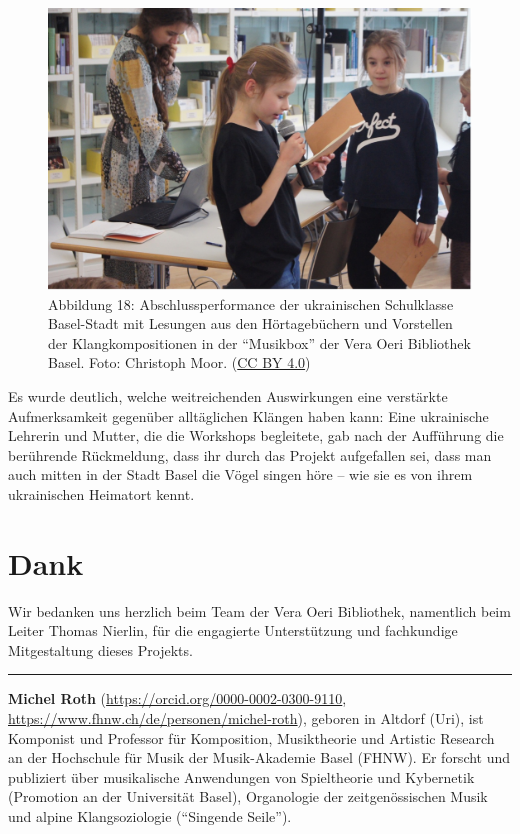 \documentclass[a4paper,
fontsize=11pt,
oneside,
numbers=noperiodatend,
parskip=half-,
bibliography=totoc,
final
]{scrartcl}
\begin{document}
\begin{figure}
\centering
\includegraphics{img/Abb18.jpg}
\caption{Abbildung 18: Abschlussperformance der ukrainischen Schulklasse Basel-Stadt
mit Lesungen aus den Hörtagebüchern und Vorstellen der
Klangkompositionen in der \enquote{Musikbox} der Vera Oeri Bibliothek
Basel. Foto: Christoph Moor. (\href{https://creativecommons.org/licenses/by/4.0/}{CC BY 4.0})}
\end{figure}

Es wurde deutlich, welche weitreichenden Auswirkungen eine verstärkte
Aufmerksamkeit gegenüber alltäglichen Klängen haben kann: Eine
ukrainische Lehrerin und Mutter, die die Workshops begleitete, gab nach
der Aufführung die berührende Rückmeldung, dass ihr durch das Projekt
aufgefallen sei, dass man auch mitten in der Stadt Basel die Vögel
singen höre -- wie sie es von ihrem ukrainischen Heimatort kennt.


\hypertarget{dankt}{%
\section{Dank}\label{dank}}

Wir bedanken uns herzlich beim Team der Vera Oeri Bibliothek, namentlich
beim Leiter Thomas Nierlin, für die engagierte Unterstützung und
fachkundige Mitgestaltung dieses Projekts.

\begin{center}\rule{0.5\linewidth}{0.5pt}\end{center}

\textbf{Michel Roth} (\url{https://orcid.org/0000-0002-0300-9110},
\url{https://www.fhnw.ch/de/personen/michel-roth}), geboren in Altdorf
(Uri), ist Komponist und Professor für Komposition, Musiktheorie und
Artistic Research an der Hochschule für Musik der Musik-Akademie Basel
(FHNW). Er forscht und publiziert über musikalische Anwendungen von
Spieltheorie und Kybernetik (Promotion an der Universität Basel),
Organologie der zeitgenössischen Musik und alpine Klangsoziologie
(\enquote{Singende Seile}).
\end{document}
